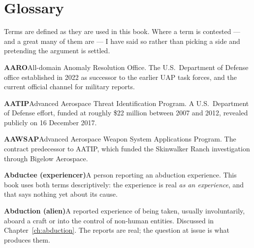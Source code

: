 \chapter{Glossary}

Terms are defined as they are used in this book. Where a term is contested --- and a great many of
them are --- I have said so rather than picking a side and pretending the argument is settled.

\begingroup
\setlength{\parskip}{4pt}
\newcommand{\gloss}[2]{\noindent\textbf{\color{inkblue}#1}\quad #2\par}
\newcommand{\glossletter}[1]{%
  \par\addvspace{13pt}\Needspace*{4\baselineskip}%
  \noindent\greenbar{\sffamily\bfseries\LARGE\color{inkblue}#1}%
  \par\nointerlineskip\vspace{3pt}%
  \noindent{\color{ufogreen}\rule{\textwidth}{1.6pt}}\par\vspace{5pt}}

\glossletter{A}

\gloss{AARO}{All-domain Anomaly Resolution Office. The U.S.\ Department of Defense office established in 2022 as successor to the earlier UAP task forces, and the current official channel for military reports.}

\gloss{AATIP}{Advanced Aerospace Threat Identification Program. A U.S.\ Department of Defense effort,
funded at roughly \$22 million between 2007 and 2012, revealed publicly on 16 December 2017.}

\gloss{AAWSAP}{Advanced Aerospace Weapon System Applications Program. The contract predecessor to AATIP, which funded the Skinwalker Ranch investigation through Bigelow Aerospace.}

\gloss{Abductee (experiencer)}{A person reporting an abduction experience. This book uses both terms descriptively: the experience is real \emph{as an experience}, and that says nothing yet about its cause.}

\gloss{Abduction (alien)}{A reported experience of being taken, usually involuntarily, aboard a craft
or into the control of non-human entities. Discussed in Chapter~\ref{ch:abduction}. The reports are
real; the question at issue is what produces them.}

